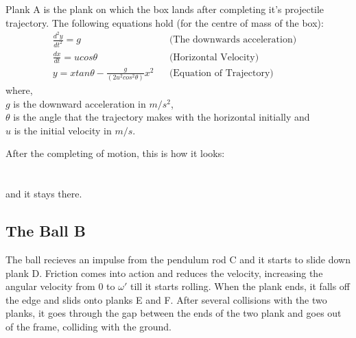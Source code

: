 \documentclass[11pt]{article}
\begin{document}
Plank A  is the plank on which the box lands after completing it's projectile trajectory. The following equations hold \cite{hcv} (for the centre of mass of the box):
\begin{align}
\frac{d^2 y}{dt^2} = g &&\mbox{(The downwards acceleration)}&
\\
\frac{dx}{dt} = ucos\theta &&\mbox{(Horizontal Velocity)}&
\\
y = xtan\theta - \frac{g}{(2u^2 cos^2 \theta)}x^2 &&\mbox{(Equation of Trajectory)}&
\end{align}
where,\\
$g$ is the downward acceleration in $m/s^2$,\\
$\theta$ is the angle that the trajectory makes with the horizontal initially and\\
$u$ is the initial velocity in $m/s$.

After the completing of motion, this is how it looks: \\
\\
\setlength\fboxsep{2pt}
\setlength\fboxrule{1pt}
\\

and it stays there.

\pagebreak

\subsection{The Ball B}
The ball recieves an impulse from the pendulum rod C and it starts to slide down plank D. Friction comes into action and reduces the velocity, increasing the angular velocity from $0$ to $\omega '$ till it starts rolling. When the plank ends, it falls off the edge and slids onto planks E and F. \cite{halliday} After several collisions with the two planks, it goes through the gap between the ends of the two plank and goes out of the frame, colliding with the ground.\\
\\
\setlength\fboxsep{2pt}
\setlength\fboxrule{1pt}
\\
\end{document}
